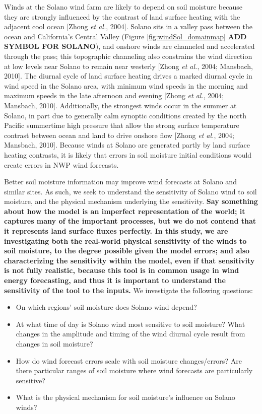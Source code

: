 Winds at the Solano wind farm are likely to depend on soil moisture because they are strongly influenced by the contrast of land surface heating with the adjacent cool ocean [Zhong \textit{et al.}, 2004].  Solano sits in a valley pass between the ocean and California's Central Valley (Figure \ref{fig:windSol_domainmap} \textbf{ADD SYMBOL FOR SOLANO}), and onshore winds are channeled and accelerated through the pass; this topographic channeling also constrains the wind direction at low levels near Solano to remain near westerly [Zhong \textit{et al.}, 2004; Mansbach, 2010].  The diurnal cycle of land surface heating drives a marked diurnal cycle in wind speed in the Solano area, with minimum wind speeds in the morning and maximum speeds in the late afternoon and evening [Zhong \textit{et al.}, 2004; Mansbach, 2010].  Additionally, the strongest winds occur in the summer at Solano, in part due to generally calm synoptic conditions created by the north Pacific summertime high pressure that allow the strong surface temperature contrast between ocean and land to drive onshore flow [Zhong \textit{et al.}, 2004; Mansbach, 2010]. Because winds at Solano are generated partly by land surface heating contrasts, it is likely that errors in soil moisture initial conditions would create errors in NWP wind forecasts.

Better soil moisture information may improve wind forecasts at Solano and similar sites.  As such, we seek to understand the sensitivity of Solano wind to soil moisture, and the physical mechanism underlying the sensitivity.  \textbf{Say something about how the model is an imperfect representation of the world; it captures many of the important processes, but we do not contend that it represents land surface fluxes perfectly.  In this study, we are investigating both the real-world physical sensitivity of the winds to soil moisture, to the degree possible given the model errors; and also characterizing the sensitivity within the model, even if that sensitivity is not fully realistic, because this tool is in common usage in wind energy forecasting, and thus it is important to understand the sensitivity of the tool to the inputs.}  We investigate the following questions:
\begin{itemize}
\item On which regions' soil moisture does Solano wind depend?
\item At what time of day is Solano wind most sensitive to soil moisture?  What changes in the amplitude and timing of the wind diurnal cycle result from changes in soil moisture?
\item How do wind forecast errors scale with soil moisture changes/errors?  Are there particular ranges of soil moisture where wind forecasts are particularly sensitive?
\item What is the physical mechanism for soil moisture's influence on Solano winds?
\end{itemize}

